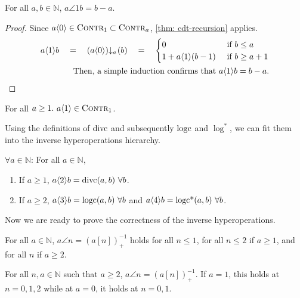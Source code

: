 \begin{lem}
For all $a, b\in \mathbb{N}$, $a\angle{1}b = b - a$.
\end{lem}
\begin{proof}
Since $a\langle 0\rangle \in \text{\scshape{Contr}}_1 \subset \text{\scshape{Contr}}_{a}$, \cref{thm: cdt-recursion} applies.
\begin{equation*}
\begin{split}
a\angle{1}b \quad = \quad \cdt{\left(a\angle{0}\right)}{a}(b) \quad = \quad \begin{cases}
0 & \text{ if } b\le a \\ 1 + a\angle{1}(b - 1) & \text{ if } b\ge a+1 \end{cases} \\
\text{Then, a simple induction confirms that } a\angle{1}b = b - a.
\end{split}
\end{equation*}
\end{proof}
\begin{col} \label{col: inv-hyperop-1-contr1}
For all $a \ge 1.~ a\langle 1\rangle \in \text{\scshape{Contr}}_1$.
\end{col}
Using the definitions of $\text{divc}$ and subsequently $\text{logc}$ and $\log^*$, we can fit them into the inverse hyperoperations hierarchy.
\begin{col} \label{col: inv-hyperop-234}
{\color{magenta}$\forall a \in \mathbb{N}$}:
 {\color{blue} For all $a \in \mathbb{N}$},
\begin{enumerate}
	\item If $a\ge 1$, $a\langle 2\rangle b = \text{divc}(a, b) \ \forall b$.
	\item If $a\ge 2$, $a\langle 3\rangle b = \text{logc}(a, b) \ \forall b$ and $a\langle 4\rangle b = \text{logc*}(a, b) \ \forall b$.
\end{enumerate}
\end{col}
Now we are ready to prove the correctness of the inverse hyperoperations.
\begin{thm} \label{thm: inv-hyperop-correct}
{\color{magenta}For all $a\in \mathbb{N}$, $a\angle{n} = \left(a[n]\right)^{-1}_+$ holds for all $n\le 1$, for all $n \le 2$ if $a\ge 1$, and for all $n$ if $a\ge 2$.}

{\color{blue} For all $n, a\in \mathbb{N}$ such that $a\ge 2$, $a\angle{n} = \left(a[n]\right)^{-1}_+$. If $a = 1$, this holds at $n = 0, 1, 2$ while at $a = 0$, it holds at $n = 0, 1$.}
\end{thm}
